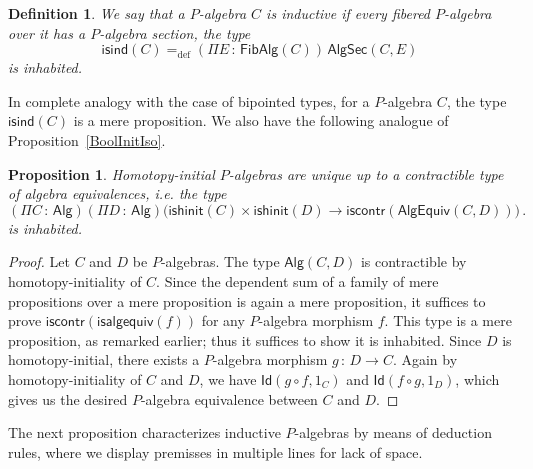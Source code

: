 \documentclass[10pt,a4paper,oneside,reqno]{amsart}
\numberwithin{equation}{section}
\theoremstyle{mythm}
\newtheorem{proposition}[theorem]{Proposition}
\theoremstyle{mydef}
\newtheorem{definition}[theorem]{Definition}
\theoremstyle{myrmk}
\newcommand{\ie}{\text{i.e.\ }}
\newcommand{\defeq}{=_{\mathrm{def}}}
\newcommand{\co}{\,{:}\,}
\newcommand{\iscontr}{\mathsf{iscontr}}
\newcommand{\isalgind}{\mathsf{isind}}
\newcommand{\isalghinit}{\mathsf{ishinit}}
\newcommand{\Id}{\mathsf{Id}}
\newcommand{\Palg}{\mathsf{Alg}}
\newcommand{\isalgequiv}{\mathsf{isalgequiv}}
\newcommand{\AlgEquiv}{\mathsf{AlgEquiv}}
\newcommand{\FibPalg}{\mathsf{FibAlg}}
\newcommand{\PalgSec}{\mathsf{AlgSec}}
\begin{document}
\begin{definition}\label{def:Wind}
We say that a $P$-algebra $C$  is \emph{inductive} if every fibered $P$-algebra
over it has a $P$-algebra section, \ie the type
\[ 
\isalgind(C) \defeq (\Pi E \co \FibPalg(C)) \,  \PalgSec(C,E) 
\]  
is inhabited.
\end{definition}

In complete analogy with the case of bipointed types, for a $P$-algebra $C$, the type $\isalgind(C)$ is a mere proposition. We also have the following analogue of Proposition~\ref{BoolInitIso}. 



\begin{proposition} \label{WHInitIso} 
Homotopy-initial $P$-algebras are unique up to a  contractible type of algebra equivalences, i.e. the type
\[ 
(\Pi C \co \Palg) (\Pi D \co \Palg) \big( \isalghinit(C) \times \isalghinit(D)  \to 
\iscontr(\AlgEquiv(C,D)) \big) \, .
\] 
is inhabited.
\end{proposition}

\begin{proof} Let $C$ and $D$ be $P$-algebras. The type $\Palg(C,D)$ is contractible by homotopy-initiality of $C$. Since the dependent sum of a family of mere propositions over a mere proposition is again a mere proposition, it suffices to prove $\iscontr(\isalgequiv(f))$ for any $P$-algebra morphism $f$. This type is a mere proposition, as remarked earlier; thus it suffices to show it is inhabited.
Since $D$ is homotopy-initial, there exists a $P$-algebra morphism $g \co D \to C$. Again by homotopy-initiality of $C$ and 
$D$, we have $\Id(g \circ f, 1_C)$ and $\Id(f \circ g, 1_D)$, which gives us the desired $P$-algebra equivalence between 
$C$ and $D$.
\end{proof}



 The next proposition characterizes
inductive $P$-algebras by means of deduction rules, where we display premisses in multiple lines for
lack of space.
\end{document}
